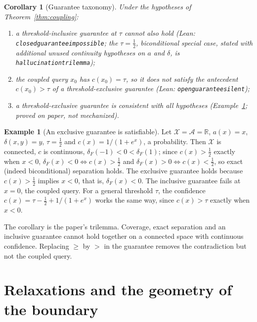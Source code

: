 \documentclass[10pt]{article}
\newtheorem{corollary}[theorem]{Corollary}
\theoremstyle{definition}
\newtheorem{example}{Example}
\theoremstyle{remark}
\newcommand{\X}{\mathcal{X}}
\newcommand{\A}{\mathcal{A}}
\newcommand{\R}{\mathbb{R}}
\newcommand{\conf}{c}
\newcommand{\dF}{\delta_{\!F}}
\newcommand{\leanid}[1]{{\def\_{\textunderscore\allowbreak}\texttt{#1}}}
\begin{document}
\begin{corollary}[Guarantee taxonomy]
\label{cor:policy}
Under the hypotheses of Theorem~\ref{thm:coupling}:
\begin{enumerate}[label=(\roman*),leftmargin=*,itemsep=1pt,topsep=2pt]
\item a threshold-inclusive guarantee at $\tau$ cannot also hold
(Lean: \leanid{closed\_guarantee\_impossible}; the $\tau=\tfrac12$,
biconditional special case, stated with additional unused continuity
hypotheses on $a$ and $\delta$, is \leanid{hallucination\_trilemma});
\item the coupled query $x_0$ has $\conf(x_0)=\tau$, so it does not
satisfy the antecedent $\conf(x_0)>\tau$ of a threshold-exclusive
guarantee (Lean: \leanid{open\_guarantee\_silent});
\item a threshold-exclusive guarantee is consistent with all hypotheses
(Example~\ref{ex:exclusive}; proved on paper, not mechanized).
\end{enumerate}
\end{corollary}

\begin{example}[An exclusive guarantee is satisfiable]
\label{ex:exclusive}
Let $\X=\A=\R$, $a(x)=x$, $\delta(x,y)=y$, $\tau=\tfrac12$ and
$\conf(x)=1/(1+e^{x})$, a probability. Then $\X$ is connected, $\conf$ is continuous,
$\dF(-1)<0<\dF(1)$; since $\conf(x)>\tfrac12$ exactly when $x<0$,
$\dF(x)<0\Leftrightarrow\conf(x)>\tfrac12$ and
$\dF(x)>0\Leftrightarrow\conf(x)<\tfrac12$, so exact (indeed
biconditional) separation holds. The exclusive guarantee holds because
$\conf(x)>\tfrac12$ implies $x<0$, that is, $\dF(x)<0$. The inclusive
guarantee fails at $x=0$, the coupled query. For a general threshold
$\tau$, the confidence $\conf(x)=\tau-\tfrac12+1/(1+e^{x})$ works the
same way, since $\conf(x)>\tau$ exactly when $x<0$.
\end{example}

The corollary is the paper's trilemma. Coverage, exact separation and an
inclusive guarantee cannot hold together on a connected space with
continuous confidence. Replacing $\ge$ by $>$ in the guarantee removes
the contradiction but not the coupled query.

\section{Relaxations and the geometry of the boundary}
\label{sec:geometry}
\end{document}

